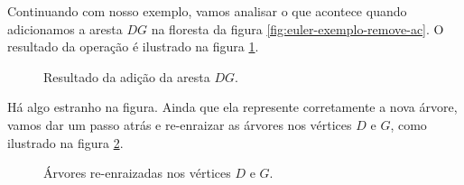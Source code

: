 
Continuando com nosso exemplo, vamos analisar o que acontece quando adicionamos a aresta $DG$ na floresta da figura \ref{fig:euler-exemplo-remove-ac}. O resultado da operação é ilustrado na figura \ref{fig:euler-exemplo-adiciona-dg}.

\begin{figure}[H]
        \centering
        \caption{Resultado da adição da aresta $DG$.}
        \label{fig:euler-exemplo-adiciona-dg}
\end{figure}

Há algo estranho na figura. Ainda que ela represente corretamente a nova árvore, vamos dar um passo atrás e re-enraizar as árvores nos vértices $D$ e $G$, como ilustrado na figura \ref{fig:euler-exemplo-re-enraiza}.

\begin{figure}[H]
    \caption{Árvores re-enraizadas nos vértices $D$ e $G$.}
    \label{fig:euler-exemplo-re-enraiza}
        \centering
\end{figure}

